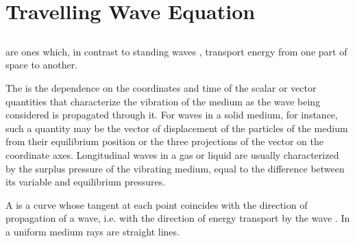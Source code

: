 \section{Travelling Wave Equation}
\label{sec-30.2} 


\subsection{}\label{30.2.1}  are ones which, in contrast to standing waves , transport energy from one part of space to another.

The  is the dependence on the coordinates and time of the scalar or vector quantities that characterize the vibration of the medium as the wave being considered is propagated through it. For waves in a solid medium, for instance, such a quantity may be the vector of displacement of the particles of the medium  from their equilibrium position or the three projections of the vector on the coordinate axes. Longitudinal waves in a gas or liquid are usually characterized by the surplus pressure of the vibrating medium, equal to the difference between its variable and equilibrium pressures.

A  is a curve whose tangent at each point coincides with the direction of propagation of a wave, i.e. with the direction of energy transport by the wave . In a uniform medium  rays are straight lines.

